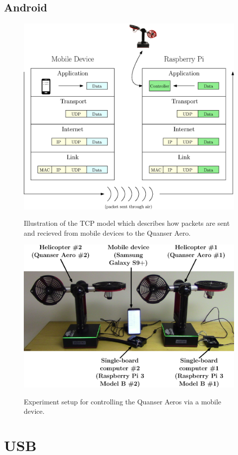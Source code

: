 \subsection{Android}
\begin{figure}[!htbp]
    \centering
    \includegraphics[width=.46\textwidth,keepaspectratio=true]{figs/ipe/TCPModel.eps}
    \label{fig:TCPModel}
    \caption{Illustration of the TCP model which describes how packets are sent and recieved from mobile devices to the Quanser Aero.}
\end{figure}

\begin{figure}[!htbp]
    \centering
    \includegraphics[width=.5\textwidth,keepaspectratio=true]{figs/ipe/Setup.eps}
    \label{fig:Setup}
    \caption{Experiment setup for controlling the Quanser Aeros via a mobile device.}
\end{figure}

\section{USB}
